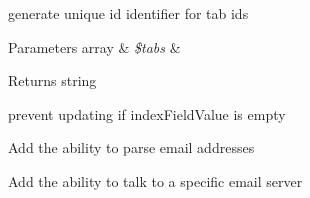 
\begin{DoxyRefList}
\item[\label{todo__todo000001}%
\hypertarget{todo__todo000001}{}%
Member \hyperlink{classCody_a91baebb215438e27a00b211a2e352b14}{Cody\+:\+:boot\+Strap\+Tabs} (\$tabs=array())]generate unique id identifier for tab ids 
\begin{DoxyParams}[1]{Parameters}
array & {\em \$tabs} & \\
\hline
\end{DoxyParams}
\begin{DoxyReturn}{Returns}
string 
\end{DoxyReturn}

\item[\label{todo__todo000002}%
\hypertarget{todo__todo000002}{}%
Member \hyperlink{classDebby_a482145f057ea4b31d4414d0ea8997244}{Debby\+:\+:update} (\$tablename, \$field\+Values, \$index\+Field\+Value)]prevent updating if index\+Field\+Value is empty  
\item[\label{todo__todo000003}%
\hypertarget{todo__todo000003}{}%
Class \hyperlink{classEmma}{Emma} ]Add the ability to parse email addresses 
\item[\label{todo__todo000004}%
\hypertarget{todo__todo000004}{}%
Member \hyperlink{classEmma_a41ce44cec1c4b79421b8fe2f0c9dc6b6}{Emma\+:\+:\+\_\+\+\_\+construct} (\$bulk\+S\+M\+S\+Username=\char`\"{}\char`\"{}, \$bulk\+S\+M\+S\+Password=\char`\"{}\char`\"{})]Add the ability to talk to a specific email server 
\end{DoxyRefList}